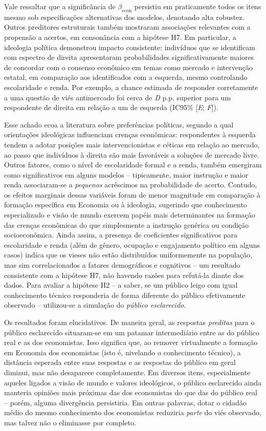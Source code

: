 Vale ressaltar que a significância de $\beta_{\text{econ}}$ persistiu em praticamente todos os itens mesmo sob especificações alternativas dos modelos, denotando alta robustez. Outros preditores estruturais também mostraram associações relevantes com a propensão a acertos, em consonância com a hipótese H7. Em particular, a ideologia política demonstrou impacto consistente: indivíduos que se identificam com espectro de direita apresentaram probabilidades significativamente maiores de concordar com o consenso econômico em temas como mercado e intervenção estatal, em comparação aos identificados com a esquerda, mesmo controlando escolaridade e renda. Por exemplo, a chance estimada de responder corretamente a uma questão de viés antimercado foi cerca de \textit{D} p.p. superior para um respondente de direita em relação a um de esquerda (IC95\% [\textit{E}; \textit{F}]). 

Esse achado ecoa a literatura sobre preferências políticas, segundo a qual orientações ideológicas influenciam crenças econômicas: respondentes à esquerda tendem a adotar posições mais intervencionistas e céticas em relação ao mercado, ao passo que indivíduos à direita são mais favoráveis a soluções de mercado livre. Outros fatores, como o nível de escolaridade formal e a renda, também emergiram como significativos em alguns modelos – tipicamente, maior instrução e maior renda associaram-se a \textit{pequenos} acréscimos na probabilidade de acerto. Contudo, os efeitos marginais dessas variáveis foram de menor magnitude em comparação à formação específica em Economia ou à ideologia, sugerindo que conhecimento especializado e visão de mundo exercem papéis mais determinantes na formação das crenças econômicas do que simplesmente a instrução genérica ou condição socioeconômica. Ainda assim, a presença de coeficientes significativos para escolaridade e renda (além de gênero, ocupação e engajamento político em alguns casos) indica que os vieses não estão distribuídos uniformemente na população, mas sim correlacionados a fatores demográficos e cognitivos – um resultado consistente com a hipótese H7, não havendo razões para refutá-la diante dos dados. Para avaliar a hipótese H2 – a saber, se um público leigo com igual conhecimento técnico responderia de forma diferente do público efetivamente observado – utilizou-se a simulação do \textit{público esclarecido}. 

Os resultados foram elucidativos. De maneira geral, as respostas \emph{preditas} para o público esclarecido situaram-se em um patamar intermediário entre as do público real e as dos economistas. Isso significa que, ao remover virtualmente a formação em Economia dos economistas (isto é, nivelando o conhecimento técnico), a distância esperada entre suas respostas e as respostas do público em geral diminui, mas não desaparece completamente. Em diversos itens, especialmente aqueles ligados a visão de mundo e valores ideológicos, o público esclarecido ainda manteria opiniões mais próximas das dos economistas do que das do público real – porém, alguma divergência persistiria. Em outras palavras, dotar o cidadão médio do mesmo conhecimento dos economistas reduziria \textit{parte} do viés observado, mas talvez não o eliminasse por completo. 

